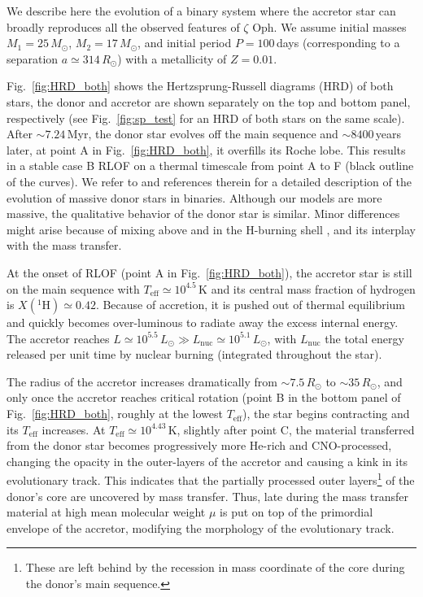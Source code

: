 \documentclass[twocolumn,twocolappendix,trackchanges]{aastex63}
\DeclareRobustCommand{\Figref}[1]{Fig.~\ref{#1}}
\newcommand{\zoph}{$\zeta$ Oph}
\begin{document}
We describe here the evolution of a binary system where the accretor
star can broadly reproduces all the observed features of \zoph. We
assume initial masses $M_1=25\,M_\odot$, $M_2=17\,M_\odot$, and initial
period $P=100$\,days (corresponding to a separation
$a\simeq314\,R_\odot$) with a metallicity of $Z=0.01$.

\Figref{fig:HRD_both} shows the Hertzsprung-Russell diagrams (HRD) of
both stars, the donor and accretor are shown separately on the top and
bottom panel, respectively (see \Figref{fig:sp_test} for an HRD of both stars on the same scale). After $\sim$$7.24$\,Myr, the donor star evolves off the main sequence and
$\sim8400$\,years later, at point A in \Figref{fig:HRD_both}, it overfills its Roche lobe. This results in a stable case B RLOF on a thermal timescale from point A to F (black outline of the curves). We refer to \cite{gotberg:17, klencki:20, laplace:21, blagorodnova:21} and references therein for a detailed description of the evolution of massive donor stars in binaries. Although our models are more massive, the qualitative behavior of the donor star is similar. Minor differences might arise because of mixing above and in the H-burning shell \citep[e.g.,][]{schootemeijer:19, klencki:21}, and its interplay with the mass transfer.

At the onset of RLOF (point A in \Figref{fig:HRD_both}), the accretor star is still on the main sequence with
$T_\mathrm{eff}\simeq10^{4.5}$\,K and its central mass fraction of hydrogen is $X(^1\mathrm{H})\simeq
0.42$. Because of accretion, it is pushed out of thermal equilibrium and quickly becomes over-luminous to radiate away the excess internal energy. The accretor reaches $L\simeq10^{5.5}\,L_\odot\gg
L_\mathrm{nuc}\simeq
10^{5.1}\,L_\odot$, with
$L_\mathrm{nuc}$ the total energy released per unit time by nuclear burning (integrated throughout the star).

The radius of the accretor increases dramatically from
$\sim7.5\,R_\odot$ to $\sim35\,R_\odot$, and only once the accretor
reaches critical rotation (point B in the bottom panel of
\Figref{fig:HRD_both}, roughly at the lowest $T_\mathrm{eff}$), the
star begins contracting and its $T_\mathrm{eff}$ increases. At
$T_\mathrm{eff}\simeq 10^{4.43}$\,K, slightly after point C, the
material transferred from the donor star becomes progressively more
He-rich and CNO-processed, changing the opacity in the outer-layers of
the accretor and causing a kink in its evolutionary track. This
indicates that the partially processed outer layers\footnote{These are
  left behind by the recession in mass coordinate of the core during
  the donor's main sequence.} of the donor's core are uncovered by
mass transfer.
Thus, late during the mass transfer material at high mean molecular
weight $\mu$ is put on top of the primordial envelope of the accretor,
modifying the morphology of the evolutionary track.
\end{document}
